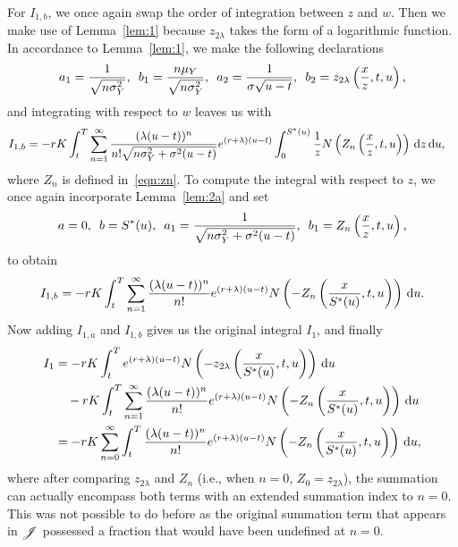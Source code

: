         	For $I_{1,b}$, we once again swap the order of integration between $z$ and $w$. Then we make use of Lemma~\ref{lem:1} because $z_{2\lambda}$ takes the form of a logarithmic function. In accordance to Lemma~\ref{lem:1}, we make the following declarations
        		$$
        			a_1 = \frac{1}{\sqrt{n\sigma_Y^2}}, \enskip b_1 = \frac{n\mu_Y}{\sqrt{n\sigma_Y^2}}, \enskip
        			a_2 = \frac{1}{\sigma\sqrt{u-t}}, \enskip b_2 = z_{2\lambda}\left( \frac{x}{z}, t, u\right),
        		$$
	and integrating with respect to $w$ leaves us with
			\begin{align*}
				I_{1,b} &= -rK  \int_t^T  \displaystyle\sum\limits_{n=1}^{\infty} \frac{(\lambda(u-t))^n}{n!\sqrt{n\sigma_Y^2 + \sigma^2(u-t)}}  e^{(r+\lambda)(u-t)} \int_0^{S^*(u)} \frac{1}{z}  N\left(Z_n \left( \frac{x}{z},t,u  \right) \right) \,\mathrm d z \, \mathrm d u,
			\end{align*}
	where $Z_n$ is defined in~\eqref{eqn:zn}. To compute the integral with respect to $z$, we once again incorporate Lemma~\ref{lem:2a} and set 
		$$
			a = 0, \enskip b = S^*(u), \enskip a_1 = \frac{1}{\sqrt{n\sigma_Y^2 + \sigma^2(u-t)}}, \enskip
			b_1 = Z_n\left( \frac{x}{z}, t, u \right),
		$$
		to obtain
		$$
			I_{1,b} = -rK  \int_t^T  \displaystyle\sum\limits_{n=1}^{\infty} \frac{(\lambda(u-t))^n}{n!}  e^{(r+\lambda)(u-t)} N\left(- Z_n \left( \frac{x}{S^*(u)},t,u  \right) \right) \, \mathrm d u.
		$$
		Now adding $I_{1,a}$ and $I_{1,b}$ gives us the original integral $I_1$, and finally
		\begin{align}
			I_1 &= -rK\int_t^T e^{(r+\lambda)(u-t)}N\left(-z_{2\lambda}\left( \frac{x}{S^*(u)},t,u\right) \right) \, \mathrm d u \nonumber \\
			 &\quad -rK  \int_t^T  \displaystyle\sum\limits_{n=1}^{\infty} \frac{(\lambda(u-t))^n}{n!}  e^{(r+\lambda)(u-t)} N\left(- Z_n \left( \frac{x}{S^*(u)},t,u  \right) \right) \, \mathrm d u \nonumber \\
			 &= -rK \displaystyle\sum\limits_{n=0}^{\infty}\int_t^T  \frac{(\lambda(u-t))^n}{n!} e^{(r+\lambda)(u-t)} N\left(-Z_n \left( \frac{x}{S^*(u)},t,u  \right) \right) \, \mathrm d u, \label{eqn:I1put}
		\end{align}
		where after comparing $z_{2\lambda}$ and $Z_n$ (i.e., when $n=0$, $Z_0 = z_{2\lambda}$), the summation can actually encompass both terms with an extended summation index to $n=0$. This was not possible to do before as the original summation term that appears in $\mathscr J$ possessed a fraction that would have been undefined at $n=0$.
		
